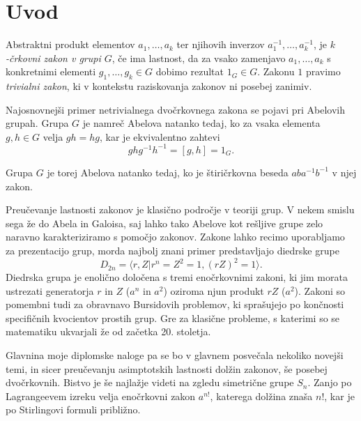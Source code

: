 \section{Uvod}


Abstraktni produkt elementov $a_1, \ldots , a_k$ ter njihovih inverzov $a_1^{-1}, \ldots , a_k^{-1}$, je \emph{$k$-črkovni zakon v grupi $G$}, če ima lastnost, da za vsako zamenjavo $a_1, \ldots, a_k$ s konkretnimi
elementi $g_1, \ldots, g_k \in G$ dobimo rezultat $1_G\in G$. Zakonu $1$ pravimo \emph{trivialni zakon}, ki v kontekstu raziskovanja zakonov ni posebej zanimiv.

Najosnovnejši primer netrivialnega dvočrkovnega zakona se pojavi pri Abelovih grupah. Grupa $G$ je namreč Abelova natanko tedaj, ko za vsaka elementa $g, h \in  G$ velja $gh = hg$, kar je ekvivalentno
zahtevi \begin{equation*}
ghg^{-1}h^{-1} = [g,h] = 1_G.
\end{equation*}

Grupa $G$ je torej Abelova natanko tedaj, ko je štiričrkovna beseda $aba^{-1}b^{-1}$ v njej zakon.

Preučevanje lastnosti zakonov je klasično področje v teoriji grup. V nekem smislu sega že do Abela in Galoisa, saj lahko tako Abelove kot rešljive grupe zelo naravno karakteriziramo s pomočjo zakonov.
Zakone lahko recimo uporabljamo za prezentacijo grup, morda najbolj znani primer predstavljajo diedrske grupe \begin{equation*}
D_{2n} = \langle r, Z  \vert  r^{n} = Z^{2} = 1, (rZ)^2 = 1 \rangle.  
\end{equation*}  
Diedrska grupa je enolično določena s tremi enočrkovnimi zakoni, ki jim morata ustrezati generatorja $r$ in $Z$ ($a^{n}$ in $a^{2}$) oziroma njun produkt $rZ$ ($a^{2}$).
Zakoni so pomembni tudi za obravnavo Bursidovih problemov, ki sprašujejo po končnosti specifičnih kvocientov prostih grup. Gre za klasične probleme, s katerimi so se matematiku ukvarjali že od začetka 20. stoletja.

Glavnina moje diplomske naloge pa se bo v glavnem posvečala nekoliko novejši temi, in sicer preučevanju asimptotskih lastnosti dolžin zakonov, še posebej dvočrkovnih.
Bistvo je še najlažje videti na zgledu simetrične grupe $S_n$. Zanjo po Lagrangeevem izreku velja enočrkovni zakon $a^{n !}$, katerega dolžina znaša $n!$, kar je po Stirlingovi formuli približno.



